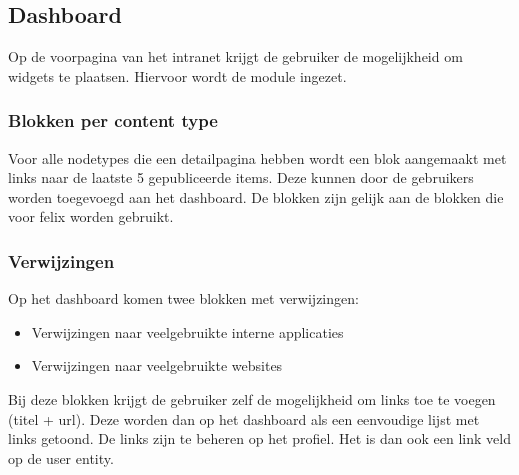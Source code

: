 \subsection{Dashboard}\label{dashboard}

Op de voorpagina van het intranet krijgt de gebruiker de mogelijkheid om widgets te plaatsen. Hiervoor wordt de  module ingezet.

\subsubsection{Blokken per content type}

Voor alle nodetypes die een detailpagina hebben wordt een blok aangemaakt met links naar de laatste 5 gepubliceerde items. Deze kunnen door de gebruikers worden toegevoegd aan het dashboard. De blokken zijn gelijk aan de blokken die voor felix worden gebruikt.

\subsubsection{Verwijzingen}

Op het dashboard komen twee blokken met verwijzingen:
\begin{itemize}
\item Verwijzingen naar veelgebruikte interne applicaties
\item Verwijzingen naar veelgebruikte websites
\end{itemize}
Bij deze blokken krijgt de gebruiker zelf de mogelijkheid om links toe te voegen (titel + url). Deze worden dan op het dashboard als een eenvoudige lijst met links getoond. De links zijn te beheren op het profiel. Het is dan ook een link veld op de user entity.


